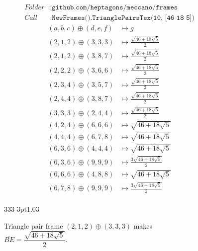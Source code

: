 \documentclass[11pt]{article}
\newenvironment{MyColorPar}[1]{
    \leavevmode\color{#1}\ignorespaces
}{
}
\begin{document}
\begin{MyColorPar}{blue}
\begin{align*}
Folder &: \texttt{github.com/heptagons/meccano/frames}\\
Call &: \texttt{NewFrames().TrianglePairsTex(10, [46 18 5])}\end{align*}
\begin{align*}
(a,b,c) \oplus (d,e,f) &\mapsto g\\
\hline
(2,1,2) \oplus (3,3,3) &\mapsto \frac{\sqrt{46+18\sqrt{5}}}{2} \\
(2,1,2) \oplus (3,8,7) &\mapsto \frac{\sqrt{46+18\sqrt{5}}}{2} \\
(2,2,2) \oplus (3,6,6) &\mapsto \frac{\sqrt{46+18\sqrt{5}}}{2} \\
(2,3,4) \oplus (3,5,7) &\mapsto \frac{\sqrt{46+18\sqrt{5}}}{2} \\
(2,4,4) \oplus (3,8,7) &\mapsto \frac{\sqrt{46+18\sqrt{5}}}{2} \\
(3,3,3) \oplus (2,4,4) &\mapsto \frac{\sqrt{46+18\sqrt{5}}}{2} \\
(4,2,4) \oplus (6,6,6) &\mapsto \sqrt{46+18\sqrt{5}} \\
(4,4,4) \oplus (6,7,8) &\mapsto \sqrt{46+18\sqrt{5}} \\
(6,3,6) \oplus (4,4,4) &\mapsto \sqrt{46+18\sqrt{5}} \\
(6,3,6) \oplus (9,9,9) &\mapsto \frac{3\sqrt{46+18\sqrt{5}}}{2} \\
(6,6,6) \oplus (4,8,8) &\mapsto \sqrt{46+18\sqrt{5}} \\
(6,7,8) \oplus (9,9,9) &\mapsto \frac{3\sqrt{46+18\sqrt{5}}}{2} \\
\end{align*}
\end{MyColorPar}

\begin{figure}[H]
\centering
\begin{center}
 {3}{3}{3} {3pt}{1.0}{3} %
\end{center}
\caption{Triangle pair frame $(2,1,2) \oplus (3,3,3)$ makes $\overline{BE} = \dfrac{\sqrt{46+18\sqrt{5}}}{2}$.}
\label{fig:tripair212333}
\end{figure}
\end{document}
